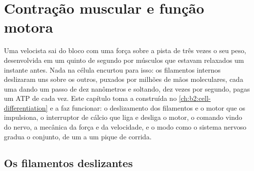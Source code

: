 \chapter{Contração muscular e função motora}\label{ch:b2:muscle-movement}

Uma velocista sai do bloco com uma força sobre a pista de três vezes o
seu peso, desenvolvida em um quinto de segundo por músculos que estavam
relaxados um instante antes. Nada na célula encurtou para isso: os
filamentos internos deslizaram uns sobre os outros, puxados por milhões
de mãos moleculares, cada uma dando um passo de dez nanômetros e
soltando, dez vezes por segundo, pagas um ATP de cada vez. Este
capítulo toma a  construída no \cref{ch:b2:cell-differentiation} e a faz
funcionar: o deslizamento dos filamentos e o motor que os impulsiona, o
interruptor de cálcio que liga e desliga o motor, o comando vindo do
nervo, a mecânica da força e da velocidade, e o modo como o sistema
nervoso gradua o conjunto, de um  a um pique de corrida.

\section{Os filamentos deslizantes}

